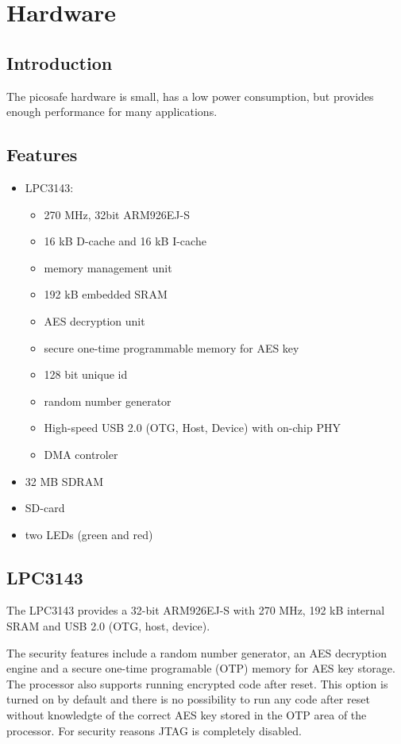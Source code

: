 \chapter{Hardware}

\section{Introduction}

The picosafe hardware is small, has a low power consumption, but provides
enough performance for many applications.

\section{Features}

\begin{itemize}
\item LPC3143:
  \begin{itemize}
  \item 270 MHz, 32bit  ARM926EJ-S
  \item 16 kB D-cache and 16 kB I-cache
  \item memory management unit
  \item 192 kB embedded SRAM
  \item AES decryption unit
  \item secure one-time programmable memory for AES key
  \item 128 bit unique id
  \item random number generator
  \item High-speed USB 2.0 (OTG, Host, Device) with on-chip PHY
  \item DMA controler
  \end{itemize}
\item 32 MB SDRAM
\item SD-card
\item two LEDs (green and red)
\end{itemize}

\section{LPC3143}

The LPC3143 provides a 32-bit ARM926EJ-S with 270 MHz, 192 kB internal SRAM and
USB 2.0 (OTG, host, device).

The security features include a random number generator, an AES decryption
engine and a secure one-time programable (OTP) memory for AES key storage. The
processor also supports running encrypted code after reset. This option is
turned on by default and there is no possibility to run any code after reset
without knowledgte of the correct AES key stored in the OTP area of the
processor. For security reasons JTAG is completely disabled.

